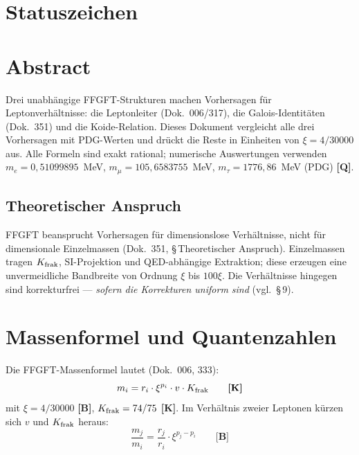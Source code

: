 \providecommand{\BM}{\textbf{[B]}}
\providecommand{\KM}{\textbf{[K]}}
\providecommand{\SM}{\textbf{[S]}}
\providecommand{\QM}{\textbf{[Q]}}

{}

\section*{Statuszeichen}


\section*{Abstract}

Drei unabhängige FFGFT-Strukturen machen Vorhersagen für Leptonverhältnisse: die
Leptonleiter (Dok.~006/317), die Galois-Identitäten (Dok.~351) und die Koide-Relation.
Dieses Dokument vergleicht alle drei Vorhersagen mit PDG-Werten und drückt die Reste
in Einheiten von $\xi = 4/30000$ aus. Alle Formeln sind exakt rational; numerische
Auswertungen verwenden $m_e = 0{,}51099895$~MeV, $m_\mu = 105{,}6583755$~MeV,
$m_\tau = 1776{,}86$~MeV (PDG) \QM.

\subsection*{Theoretischer Anspruch}

FFGFT beansprucht Vorhersagen für dimensionslose Verhältnisse, nicht für dimensionale
Einzelmassen (Dok.~351, §\,Theoretischer Anspruch). Einzelmassen tragen $K_{\rm frak}$,
SI-Projektion und QED-abhängige Extraktion; diese erzeugen eine unvermeidliche Bandbreite
von Ordnung $\xi$ bis $100\xi$. Die Verhältnisse hingegen sind korrekturfrei ---
\emph{sofern die Korrekturen uniform sind} (vgl.~§\,9).

\section{Massenformel und Quantenzahlen}

Die FFGFT-Massenformel lautet (Dok.~006, 333):
\begin{equation}
  m_i = r_i \cdot \xi^{p_i} \cdot v \cdot K_{\rm frak} \qquad \KM
\end{equation}
mit $\xi = 4/30000$ \BM, $K_{\rm frak} = 74/75$ \KM. Im Verhältnis zweier Leptonen
kürzen sich $v$ und $K_{\rm frak}$ heraus:
\begin{equation}
  \frac{m_j}{m_i} = \frac{r_j}{r_i} \cdot \xi^{p_j - p_i} \qquad \BM
\end{equation}

